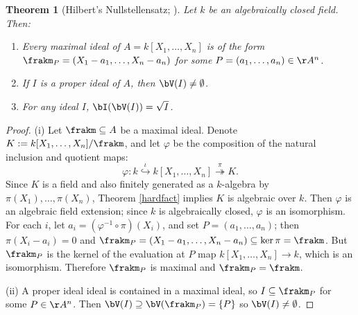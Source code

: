 \documentclass[12pt]{amsart}
\theoremstyle{plain}
\newtheorem{theorem}{Theorem}%
\begin{document}
\begin{theorem}[Hilbert's Nullstellensatz; {\cite[\S 3.10]{Reid88}}]
Let $k$ be an algebraically closed field.
Then:
\begin{enumerate}[\itshape(i)]
\item Every maximal ideal of $A = k[X_1, \ldots, X_n]$ is of the form $\frakm_P = (X_1 - a_1, \ldots, X_n - a_n)$ for some $P = (a_1, \ldots, a_n) \in \AA^n$.
\item If $I$ is a proper ideal of $A$, then $\bV(I) \ne \emptyset$.
\item For any ideal $I$, $\bI(\bV(I)) = \sqrt{I}$.
\end{enumerate}
\end{theorem}
\begin{proof}
(i) Let $\frakm \subseteq A$ be a maximal ideal.
Denote $K := k[X_1, \ldots, X_n] / \frakm$, and let $\varphi$ be the composition of the natural inclusion and quotient maps:
$$\varphi: k \overset{\iota}{\hookrightarrow} k[X_1, \ldots, X_n] \overset{\pi}{\twoheadrightarrow} K.$$
Since $K$ is a field and also finitely generated as a $k$-algebra by $\pi(X_1), \ldots, \pi(X_n)$, Theorem \ref{hardfact} implies $K$ is algebraic over $k$.
Then $\varphi$ is an algebraic field extension; since $k$ is algebraically closed, $\varphi$ is an isomorphism.
For each $i$, let $a_i = (\varphi^{-1}\circ\pi)(X_i)$, and set $P = (a_1, \ldots, a_n)$;
then $\pi(X_i - a_i) = 0$ and $\frakm_P = (X_1 - a_1, \ldots, X_n - a_n) \subseteq \ker \pi = \frakm$.
But $\frakm_P$ is the kernel of the evaluation at $P$ map $k[X_1, \ldots, X_n] \to k$, which is an isomorphism.
Therefore $\frakm_P$ is maximal and $\frakm_P = \frakm$.

(ii) A proper ideal ideal is contained in a maximal ideal, so $I \subseteq \frakm_P$ for some $P \in \AA^n$.
Then $\bV(I) \supseteq \bV(\frakm_P) = \{P\}$ so $\bV(I) \ne \emptyset$.


\end{proof}
\end{document}
